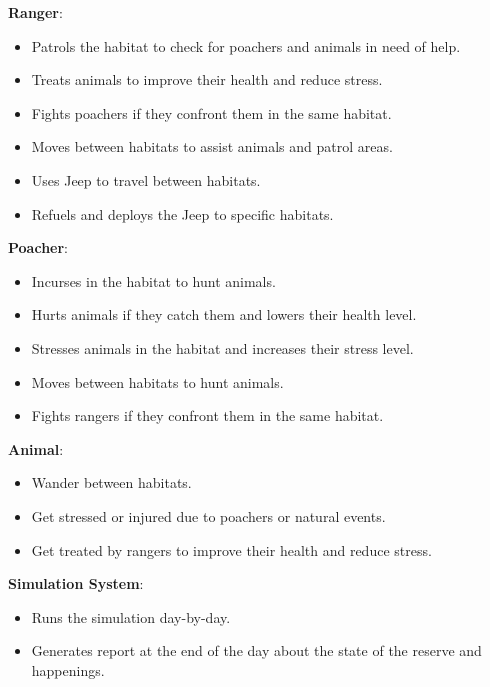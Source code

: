 \documentclass[a4paper,12pt]{article}
\begin{document}
\begin{flushleft}
\textbf{\large Ranger}:
\begin{itemize}
    \item Patrols the habitat to check for poachers and animals in need of help.
    \item Treats animals to improve their health and reduce stress.
    \item Fights poachers if they confront them in the same habitat.
    \item Moves between habitats to assist animals and patrol areas.
    \item Uses Jeep to travel between habitats.
    \item Refuels and deploys the Jeep to specific habitats.
\end{itemize}

\bigskip

\textbf{\large Poacher}:
\begin{itemize}
    \item Incurses in the habitat to hunt animals.
    \item Hurts animals if they catch them and lowers their health level.
    \item Stresses animals in the habitat and increases their stress level.
    \item Moves between habitats to hunt animals.
    \item Fights rangers if they confront them in the same habitat.
\end{itemize}

\bigskip

\textbf{\large Animal}:
\begin{itemize}
    \item Wander between habitats.
    \item Get stressed or injured due to poachers or natural events.
    \item Get treated by rangers to improve their health and reduce stress.
\end{itemize}

\bigskip

\textbf{\large Simulation System}:
\begin{itemize}
    \item Runs the simulation day-by-day.
    \item Generates report at the end of the day about the state of the reserve and happenings.
\end{itemize}
\end{flushleft}
\end{document}
